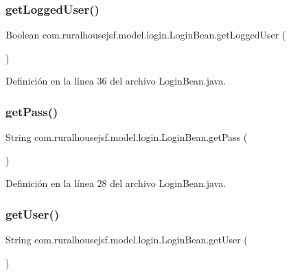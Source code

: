\subsubsection{\texorpdfstring{getLoggedUser()}{getLoggedUser()}}
{\footnotesize\ttfamily Boolean com.\+ruralhousejsf.\+model.\+login.\+Login\+Bean.\+get\+Logged\+User (\begin{DoxyParamCaption}{ }\end{DoxyParamCaption})}



Definición en la línea 36 del archivo Login\+Bean.\+java.

\mbox{\label{classcom_1_1ruralhousejsf_1_1model_1_1login_1_1_login_bean_ace5538b87e614420da9c6ce31a5c7cef}} 
\subsubsection{\texorpdfstring{getPass()}{getPass()}}
{\footnotesize\ttfamily String com.\+ruralhousejsf.\+model.\+login.\+Login\+Bean.\+get\+Pass (\begin{DoxyParamCaption}{ }\end{DoxyParamCaption})}



Definición en la línea 28 del archivo Login\+Bean.\+java.

\mbox{\label{classcom_1_1ruralhousejsf_1_1model_1_1login_1_1_login_bean_ab0769180b1eaf69f94f0aa181fc2dd40}} 
\subsubsection{\texorpdfstring{getUser()}{getUser()}}
{\footnotesize\ttfamily String com.\+ruralhousejsf.\+model.\+login.\+Login\+Bean.\+get\+User (\begin{DoxyParamCaption}{ }\end{DoxyParamCaption})}



